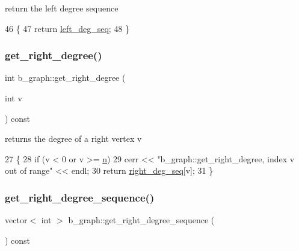 return the left degree sequence 


\begin{DoxyCode}
46 \{
47   \textcolor{keywordflow}{return} \hyperlink{classb__graph_a311d16462dbb10c47b3a6c80a42139d9}{left\_deg\_seq};
48 \}
\end{DoxyCode}
\mbox{\label{classb__graph_a1caf2e1ca8ee19e7407f489be6b171b8}} 
\subsubsection{\texorpdfstring{get\+\_\+right\+\_\+degree()}{get\_right\_degree()}}
{\footnotesize\ttfamily int b\+\_\+graph\+::get\+\_\+right\+\_\+degree (\begin{DoxyParamCaption}\item[{int}]{v }\end{DoxyParamCaption}) const}



returns the degree of a right vertex v 


\begin{DoxyCode}
27 \{
28   \textcolor{keywordflow}{if} (v < 0 or v >= \hyperlink{classb__graph_a9e211d40c1799bc9b125de472ff06642}{n})
29     cerr << \textcolor{stringliteral}{"b\_graph::get\_right\_degree, index v out of range"} << endl;
30   \textcolor{keywordflow}{return} \hyperlink{classb__graph_ae4c875ed6a583a78f38dfe958f20fad5}{right\_deg\_seq}[v];
31 \}
\end{DoxyCode}
\mbox{\label{classb__graph_a2711566385b92b02f4c03abdc1f9a582}} 
\subsubsection{\texorpdfstring{get\+\_\+right\+\_\+degree\+\_\+sequence()}{get\_right\_degree\_sequence()}}
{\footnotesize\ttfamily vector$<$ int $>$ b\+\_\+graph\+::get\+\_\+right\+\_\+degree\+\_\+sequence (\begin{DoxyParamCaption}{ }\end{DoxyParamCaption}) const}



